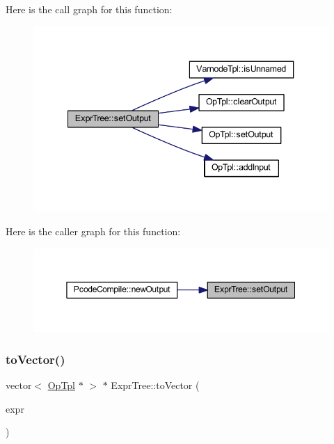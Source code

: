 Here is the call graph for this function\+:
\nopagebreak
\begin{figure}[H]
\begin{center}
\leavevmode
\includegraphics[width=340pt]{class_expr_tree_ab8cca7f394b661cc77a309057192fddc_cgraph}
\end{center}
\end{figure}
Here is the caller graph for this function\+:
\nopagebreak
\begin{figure}[H]
\begin{center}
\leavevmode
\includegraphics[width=350pt]{class_expr_tree_ab8cca7f394b661cc77a309057192fddc_icgraph}
\end{center}
\end{figure}
\mbox{\label{class_expr_tree_ac02d77a8e8d695f150db35768b534181}} 
\subsubsection{\texorpdfstring{toVector()}{toVector()}}
{\footnotesize\ttfamily vector$<$ \mbox{\hyperlink{class_op_tpl}{Op\+Tpl}} $\ast$ $>$ $\ast$ Expr\+Tree\+::to\+Vector (\begin{DoxyParamCaption}\item[{\mbox{\hyperlink{class_expr_tree}{Expr\+Tree}} $\ast$}]{expr }\end{DoxyParamCaption})\hspace{0.3cm}{\ttfamily [static]}}



